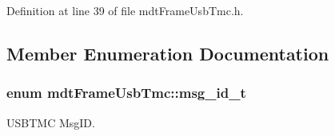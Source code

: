 Definition at line 39 of file mdtFrameUsbTmc.h.



\subsection{Member Enumeration Documentation}
\hypertarget{classmdt_frame_usb_tmc_a10c2216157b0616b69f6cabc5c8e253b}{
\subsubsection[{msg\_\-id\_\-t}]{\setlength{\rightskip}{0pt plus 5cm}enum {\bf mdtFrameUsbTmc::msg\_\-id\_\-t}}}
\label{classmdt_frame_usb_tmc_a10c2216157b0616b69f6cabc5c8e253b}


USBTMC MsgID. 

